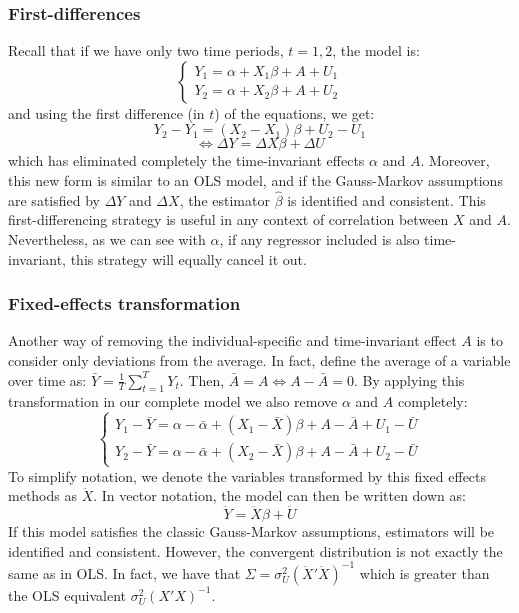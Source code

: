 \documentclass[12pt]{report}
\begin{document}
\subsubsection{First-differences}

Recall that if we have only two time periods, $t=1,2$, the model is: $$
\begin{cases} 
Y_1 = \alpha + X_1\beta + A + U_1 \\
Y_2 = \alpha + X_2\beta + A+ U_2
\end{cases} $$ and using the first difference (in $t$) of the equations, we get: $$Y_2 - Y_1 =  (X_2 - X_1)\beta + U_2 - U_1 $$ $$\Leftrightarrow \Delta Y = \Delta X \beta + \Delta U $$ which has eliminated completely the time-invariant effects $\alpha$ and $A$. Moreover, this new form is similar to an OLS model, and if the Gauss-Markov assumptions are satisfied by $\Delta Y$ and $\Delta X$, the estimator $\hat\beta$ is identified and consistent. This first-differencing strategy is useful in any context of correlation between $X$ and $A$. Nevertheless, as we can see with $\alpha$, if any regressor included is also time-invariant, this strategy will equally cancel it out.

\subsubsection{Fixed-effects transformation}

Another way of removing the individual-specific and time-invariant effect $A$ is to consider only deviations from the average. In fact, define the average of a variable over time as: $\bar Y = \frac{1}{T}\sum_{t=1}^T Y_t $. Then, $\bar A = A \Leftrightarrow A - \bar A = 0$. By applying this transformation in our complete model we also remove $\alpha$ and $A$ completely:$$
\begin{cases} 
Y_1 - \bar Y = \alpha - \bar\alpha + (X_1 - \bar X)\beta + A - \bar A + U_1 - \bar U \\
Y_2 - \bar Y  = \alpha - \bar\alpha + (X_2 - \bar X)\beta + A- \bar A + U_2- \bar U
\end{cases} $$ To simplify notation, we denote the variables transformed by this fixed effects methods as $\ddot X$. In vector notation, the model can then be written down as: $$\ddot Y = \ddot X\beta + \ddot U $$
If this model satisfies the classic Gauss-Markov assumptions, estimators will be identified and consistent. However, the convergent distribution is not exactly the same as in OLS. In fact, we have that $\Sigma = \sigma_U^2(\ddot X'\ddot X)^{-1}$ which is greater than the OLS equivalent $\sigma_U^2( X' X)^{-1}$.
\end{document}
